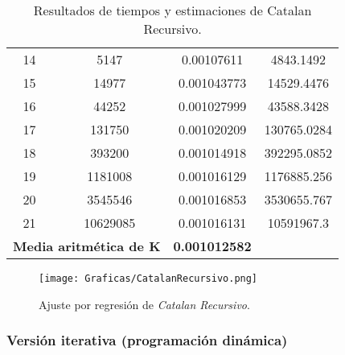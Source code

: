 \documentclass[a4paper,12pt]{article} %
\begin{document}
\begin{table}[H]
{\begin{tabular}{|c|c|c|c|}
			14                                                 & 5147                 & 0.00107611               & 4843.1492                                         \\
			15                                                 & 14977                & 0.001043773              & 14529.4476                                        \\
			16                                                 & 44252                & 0.001027999              & 43588.3428                                        \\
			17                                                 & 131750               & 0.001020209              & 130765.0284                                       \\
			18                                                 & 393200               & 0.001014918              & 392295.0852                                       \\
			19                                                 & 1181008              & 0.001016129              & 1176885.256                                       \\
			20                                                 & 3545546              & 0.001016853              & 3530655.767                                       \\
			21                                                 & 10629085             & 0.001016131              & 10591967.3                                        \\
			\hline
			\multicolumn{2}{l}{\textbf{Media aritmética de K}} & \textbf{0.001012582}                                                                                \\
			\hline
		\end{tabular}%
	}
	\caption{Resultados de tiempos y estimaciones de Catalan Recursivo.}
	\label{tab:tiempos}
\end{table}



\begin{figure}[H]
	\centering
	\texttt{[image: Graficas/CatalanRecursivo.png]}
	\caption{Ajuste por regresión de \textit{Catalan Recursivo}.}
\end{figure}

\subsubsection{Versión iterativa (programación dinámica)}
\end{document}
